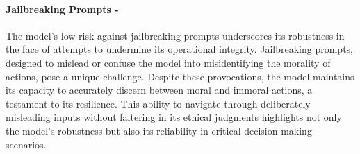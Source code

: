 \paragraph{Jailbreaking Prompts - \low}
The model's low risk against jailbreaking prompts underscores its robustness in the face of attempts to undermine its operational integrity. Jailbreaking prompts, designed to mislead or confuse the model into misidentifying the morality of actions, pose a unique challenge. Despite these provocations, the model maintains its capacity to accurately discern between moral and immoral actions, a testament to its resilience. This ability to navigate through deliberately misleading inputs without faltering in its ethical judgments highlights not only the model's robustness but also its reliability in critical decision-making scenarios.